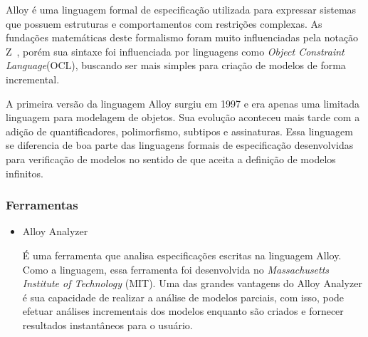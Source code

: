 Alloy é uma linguagem formal de especificação utilizada para expressar sistemas que possuem
estruturas e comportamentos com restrições complexas. As fundações matemáticas deste formalismo
foram muito influenciadas pela notação Z~\cite{opac-b1091336}, porém sua sintaxe foi influenciada
por linguagens como \textit{Object Constraint Language}(OCL), buscando ser mais simples para
criação de modelos de forma incremental.

A primeira versão da linguagem Alloy surgiu em 1997 e era apenas uma limitada linguagem para modelagem
de objetos. Sua evolução aconteceu mais tarde com a adição de quantificadores, polimorfismo, subtipos e
assinaturas. Essa linguagem se diferencia de boa parte das linguagens formais de especificação desenvolvidas
para verificação de modelos no sentido de que aceita a definição de modelos infinitos.

\subsubsection{Ferramentas}
\begin{itemize}
\item{Alloy Analyzer}

É uma ferramenta que analisa especificações escritas na linguagem Alloy. Como a linguagem, essa ferramenta
foi desenvolvida no \textit{Massachusetts Institute of Technology} (MIT). Uma das grandes vantagens do Alloy
Analyzer é sua capacidade de realizar a análise de modelos parciais, com isso, pode efetuar análises incrementais
dos modelos enquanto são criados e fornecer resultados instantâneos para o usuário.

\end{itemize}
